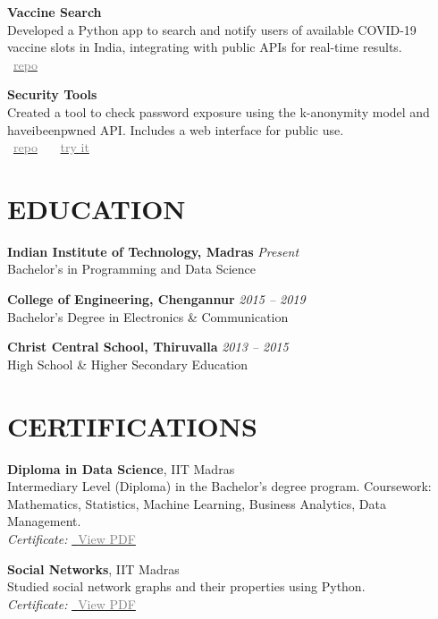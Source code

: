 \documentclass[11pt,a4paper]{article}
\begin{document}
\textbf{Vaccine Search} \\
Developed a Python app to search and notify users of available COVID-19 vaccine slots in India, integrating with public APIs for real-time results. \\
\faGithub~\href{https://github.com/jishnujp/vaccine_search}{\textcolor{gray}{repo}} 

\textbf{Security Tools} \\
Created a tool to check password exposure using the k-anonymity model and haveibeenpwned API. Includes a web interface for public use. \\
\faGithub~\href{https://github.com/jishnujp/securityTools}{\textcolor{gray}{repo}} \, \textbar{} \,
\faGlobe~\href{https://jishnujp.github.io/securityTools}{\textcolor{gray}{try it}} 

\section*{EDUCATION}
\textbf{Indian Institute of Technology, Madras} \hfill \textit{Present} \\
Bachelor's in Programming and Data Science

\textbf{College of Engineering, Chengannur} \hfill \textit{2015 -- 2019} \\
Bachelor's Degree in Electronics \& Communication

\textbf{Christ Central School, Thiruvalla} \hfill \textit{2013 -- 2015} \\
High School \& Higher Secondary Education

\section*{CERTIFICATIONS}
\textbf{Diploma in Data Science}, IIT Madras \\
Intermediary Level (Diploma) in the Bachelor's degree program. Coursework: Mathematics, Statistics, Machine Learning, Business Analytics, Data Management. \\
\textit{Certificate:} \href{/certificates/data_science_diploma.pdf}{\faFilePdfO~\textcolor{gray}{View PDF}}

\textbf{Social Networks}, IIT Madras \\
Studied social network graphs and their properties using Python. \\
\textit{Certificate:} \href{https://archive.nptel.ac.in/content/noc/NOC22/SEM1/Ecertificates/106/noc22-cs30/Course/NPTEL22CS30S4373058402018648.jpg}{\faFilePdfO~\textcolor{gray}{View PDF}}
\end{document}
